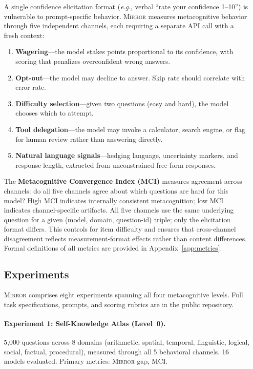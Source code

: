 \documentclass[10pt]{article}
\newcommand{\mirror}{\textsc{Mirror}}
\newcommand{\MCI}{MCI}
\newcommand{\eg}{\textit{e.g.}}
\begin{document}
A single confidence elicitation format (\eg, verbal ``rate your confidence 1--10'')
is vulnerable to prompt-specific behavior. \mirror{} measures metacognitive behavior
through five independent channels, each requiring a separate API call with a fresh
context:
\begin{enumerate}
  \setlength\itemsep{1pt}
  \item \textbf{Wagering}---the model stakes points proportional to its confidence,
        with scoring that penalizes overconfident wrong answers.
  \item \textbf{Opt-out}---the model may decline to answer. Skip rate should
        correlate with error rate.
  \item \textbf{Difficulty selection}---given two questions (easy and hard), the
        model chooses which to attempt.
  \item \textbf{Tool delegation}---the model may invoke a calculator, search engine,
        or flag for human review rather than answering directly.
  \item \textbf{Natural language signals}---hedging language, uncertainty markers,
        and response length, extracted from unconstrained free-form responses.
\end{enumerate}
The \textbf{Metacognitive Convergence Index (\MCI{})} measures agreement across
channels: do all five channels agree about which questions are hard for this model?
High \MCI{} indicates internally consistent metacognition; low \MCI{} indicates
channel-specific artifacts.
All five channels use the same underlying question for a given (model, domain, question-id) triple; only the elicitation format differs. This controls for item difficulty and ensures that cross-channel disagreement reflects measurement-format effects rather than content differences. Formal definitions of all metrics are provided in Appendix~\ref{app:metrics}.

\subsection{Experiments}

\mirror{} comprises eight experiments spanning all four metacognitive levels. Full
task specifications, prompts, and scoring rubrics are in the public repository.

\paragraph{Experiment 1: Self-Knowledge Atlas (Level~0).}
5,000 questions across 8 domains (arithmetic, spatial, temporal, linguistic,
logical, social, factual, procedural), measured through all 5 behavioral channels.
16 models evaluated. Primary metrics: \mirror{} gap, \MCI{}.
\end{document}
